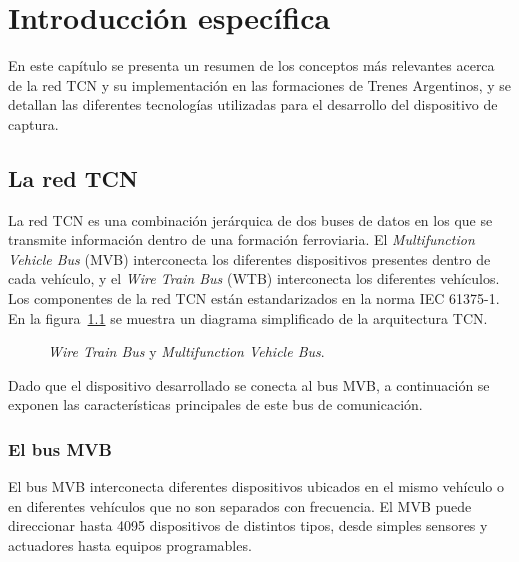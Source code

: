 \chapter{Introducción específica}

En este capítulo se presenta un resumen de los conceptos más relevantes acerca de la red TCN y su implementación en las formaciones de Trenes Argentinos, y se detallan las diferentes tecnologías utilizadas para el desarrollo del dispositivo de captura.

\section{La red TCN}

La red TCN es una combinación jerárquica de dos buses de datos en los que se transmite información dentro de una formación ferroviaria. El \textit{Multifunction Vehicle Bus} (MVB) interconecta los diferentes dispositivos presentes dentro de cada vehículo, y el \textit{Wire Train Bus} (WTB) interconecta los diferentes vehículos. Los componentes de la red TCN están estandarizados en la norma IEC 61375-1. En la figura~\ref{fig:tcn-mvb-wtb} se muestra un diagrama simplificado de la arquitectura TCN.

\begin{figure}[htbp]
	\centering
    {
        \fontsize{9pt}{9pt}\selectfont
        
    }
	\caption[\textit{Wire Train Bus} y \textit{Multifunction Vehicle Bus}]{\textit{Wire Train Bus} y \textit{Multifunction Vehicle Bus}.\footnotemark}
    \label{fig:tcn-mvb-wtb}
\end{figure}

Dado que el dispositivo desarrollado se conecta al bus MVB, a continuación se exponen las características principales de este bus de comunicación.

\subsection{El bus MVB}

El bus MVB interconecta diferentes dispositivos ubicados en el mismo vehículo o en diferentes vehículos que no son separados con frecuencia. El MVB puede direccionar hasta 4095 dispositivos de distintos tipos, desde simples sensores y actuadores hasta equipos programables.

